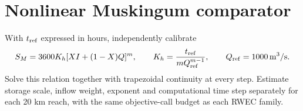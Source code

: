 \documentclass[11pt]{article}
\begin{document}
\section*{Nonlinear Muskingum comparator}
With $t_{\rm ref}$ expressed in hours, independently calibrate
\begin{equation}
S_M=3600K_h[XI+(1-X)Q]^m,\qquad K_h=\frac{t_{\rm ref}}{mQ_{\rm ref}^{m-1}},\qquad Q_{\rm ref}=1000\,\mathrm{m^3/s}.
\end{equation}
Solve this relation together with trapezoidal continuity at every step. Estimate storage scale, inflow weight, exponent and computational time step separately for each 20 km reach, with the same objective-call budget as each RWEC family.
\end{document}
